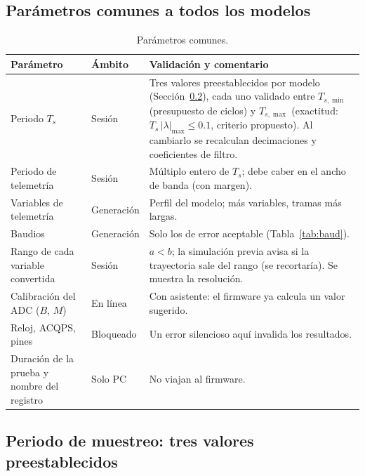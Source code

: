\documentclass[12pt,letterpaper]{article}
\begin{document}
\subsection{Parámetros comunes a todos los modelos}

\begin{table}[!htbp]
\centering
\caption{Parámetros comunes.}
\label{tab:comunes}
\begin{tabularx}{\textwidth}{>{\raggedright\arraybackslash}p{3.2cm}>{\raggedright\arraybackslash}p{1.9cm}Y}
\toprule
\textbf{Parámetro} & \textbf{Ámbito} & \textbf{Validación y comentario} \\
\midrule
Periodo $T_s$ & Sesión & Tres valores preestablecidos por modelo (Sección~\ref{sec:ts}), cada uno validado entre $T_{s,\min}$ (presupuesto de ciclos) y $T_{s,\max}$ (exactitud: $T_s\,|\lambda|_{\max}\le 0.1$, criterio propuesto). Al cambiarlo se recalculan decimaciones y coeficientes de filtro. \\
Periodo de telemetría & Sesión & Múltiplo entero de $T_s$; debe caber en el ancho de banda (con margen). \\
Variables de telemetría & Generación & Perfil del modelo; más variables, tramas más largas. \\
Baudios & Generación & Solo los de error aceptable (Tabla~\ref{tab:baud}). \\
Rango de cada variable convertida & Sesión & $a<b$; la simulación previa avisa si la trayectoria sale del rango (se recortaría). Se muestra la resolución. \\
Calibración del ADC ($B$, $M$) & En línea & Con asistente: el firmware ya calcula un valor sugerido. \\
Reloj, ACQPS, pines & Bloqueado & Un error silencioso aquí invalida los resultados. \\
Duración de la prueba y nombre del registro & Solo PC & No viajan al firmware. \\
\bottomrule
\end{tabularx}
\end{table}

\subsection{Periodo de muestreo: tres valores preestablecidos}
\label{sec:ts}
\end{document}
